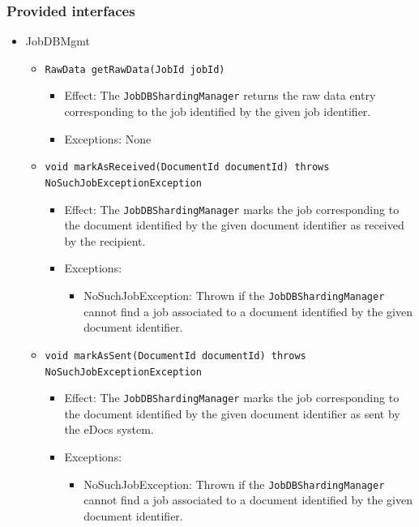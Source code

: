 \documentclass[a4paper,10pt]{article}
\begin{document}
\subsubsection*{Provided interfaces}
\begin{itemize}
    \item JobDBMgmt
    \begin{itemize}
	    \item \texttt{RawData getRawData(JobId jobId)}
        \begin{itemize}
            \item Effect: The \texttt{JobDBShardingManager} returns the raw data entry corresponding to the job identified by the given job identifier.
            \item Exceptions: None
        \end{itemize}    

     	\item \texttt{void markAsReceived(DocumentId documentId) throws NoSuchJobExceptionException}
    	\begin{itemize}
    		\item Effect: The \texttt{JobDBShardingManager} marks the job corresponding to the document identified by the given document identifier as received by the recipient.
    		\item Exceptions:
    		\begin{itemize}
    			\item NoSuchJobException: Thrown if the \texttt{JobDBShardingManager} cannot find a job associated to a document identified by the given document identifier.
    		\end{itemize}
    	\end{itemize}
    	
    	
    	
     	\item \texttt{void markAsSent(DocumentId documentId) throws NoSuchJobExceptionException}
    	\begin{itemize}
    		\item Effect: The \texttt{JobDBShardingManager} marks the job corresponding to the document identified by the given document identifier as sent by the eDocs system.
    		\item Exceptions:
    		\begin{itemize}
    			\item NoSuchJobException: Thrown if the \texttt{JobDBShardingManager} cannot find a job associated to a document identified by the given document identifier.
    		\end{itemize}
    	\end{itemize}       	   	
  

\end{itemize}
\end{itemize}
\end{document}
